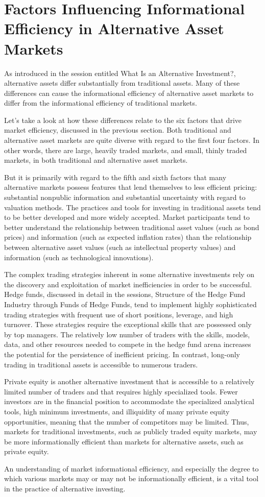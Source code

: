 \documentclass[11pt]{article}
\begin{document}
\section*{Factors Influencing Informational Efficiency in Alternative Asset Markets}
As introduced in the session entitled What Is an Alternative Investment?, alternative assets differ substantially from traditional assets. Many of these differences can cause the informational efficiency of alternative asset markets to differ from the informational efficiency of traditional markets.

Let's take a look at how these differences relate to the six factors that drive market efficiency, discussed in the previous section. Both traditional and alternative asset markets are quite diverse with regard to the first four factors. In other words, there are large, heavily traded markets, and small, thinly traded markets, in both traditional and alternative asset markets.

But it is primarily with regard to the fifth and sixth factors that many alternative markets possess features that lend themselves to less efficient pricing: substantial nonpublic information and substantial uncertainty with regard to valuation methods. The practices and tools for investing in traditional assets tend to be better developed and more widely accepted. Market participants tend to better understand the relationship between traditional asset values (such as bond prices) and information (such as expected inflation rates) than the relationship between alternative asset values (such as intellectual property values) and information (such as technological innovations).

The complex trading strategies inherent in some alternative investments rely on the discovery and exploitation of market inefficiencies in order to be successful. Hedge funds, discussed in detail in the sessions, Structure of the Hedge Fund Industry through Funds of Hedge Funds, tend to implement highly sophisticated trading strategies with frequent use of short positions, leverage, and high turnover. These strategies require the exceptional skills that are possessed only by top managers. The relatively low number of traders with the skills, models, data, and other resources needed to compete in the hedge fund arena increases the potential for the persistence of inefficient pricing. In contrast, long-only trading in traditional assets is accessible to numerous traders.

Private equity is another alternative investment that is accessible to a relatively limited number of traders and that requires highly specialized tools. Fewer investors are in the financial position to accommodate the specialized analytical tools, high minimum investments, and illiquidity of many private equity opportunities, meaning that the number of competitors may be limited. Thus, markets for traditional investments, such as publicly traded equity markets, may be more informationally efficient than markets for alternative assets, such as private equity.

An understanding of market informational efficiency, and especially the degree to which various markets may or may not be informationally efficient, is a vital tool in the practice of alternative investing.
\end{document}
